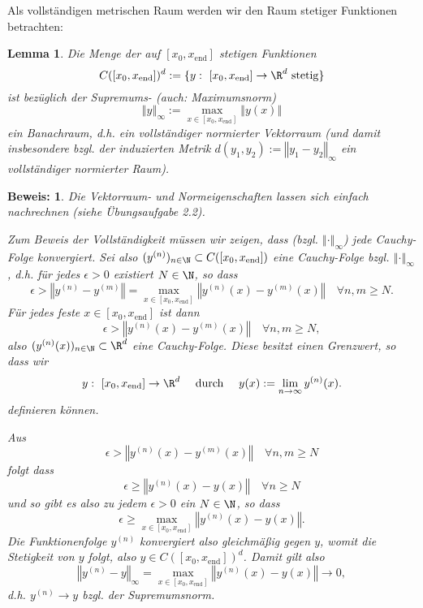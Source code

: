 \documentclass[
]{mycourse}
\theoremstyle{mythm}
\newtheorem{lemma}[theorem]{Lemma}
\theoremstyle{break}
\newtheorem*{beweis}{Beweis:}
\newcommand{\norm}[1]{\left\Vert#1\right\Vert}		%
\begin{document}
Als vollständigen metrischen Raum werden wir den Raum stetiger Funktionen betrachten:
\begin{lemma}
Die Menge der auf $[x_0,x_\mathrm{end}]$ stetigen Funktionen
\[
C([x_0,x_\mathrm{end}])^d:=\{ y: \ [x_0,x_\mathrm{end}]\to \R^d \ \mathrm{stetig} \} 
\]
ist bezüglich der \emph{Supremums-} (auch: \emph{Maximumsnorm})
\[
\norm{y}_\infty:= \max_{x\in [x_0,x_\mathrm{end}]} \norm{y(x)}
\]
ein \emph{Banachraum}, d.h. ein vollständiger normierter Vektorraum
(und damit insbesondere bzgl. der induzierten Metrik $d(y_1,y_2):=\norm{y_1-y_2}_\infty$ ein 
vollständiger normierter Raum).
\end{lemma}
\begin{beweis}
Die Vektorraum- und Normeigenschaften lassen sich einfach nachrechnen (siehe Übungsaufgabe 2.2).

Zum Beweis der Vollständigkeit müssen wir zeigen, dass (bzgl. $\norm{\cdot}_\infty$) jede Cauchy-Folge
konvergiert. Sei also $(y^ {(n)})_{n\in \N}\subset C([x_0,x_\mathrm{end}])$ eine Cauchy-Folge bzgl. $\norm{\cdot}_\infty$, d.h. für jedes $\epsilon>0$ existiert $N\in \N$, so dass
\[
\epsilon>  \norm{y^{(n)}-y^{(m)}}=  \max_{x\in [x_0,x_\mathrm{end}]}  \norm{y^{(n)}(x)-y^{(m)}(x)} \quad \forall n,m\geq N.
\]
Für jedes feste $x\in [x_0,x_\mathrm{end}]$ ist dann
\[
\epsilon>  \norm{y^{(n)}(x)-y^{(m)}(x)}  \quad \forall n,m\geq N,
\]
also $(y^{(n)}(x))_{n\in \N}\subset \R^d$ eine Cauchy-Folge. Diese besitzt einen Grenzwert,
so dass wir 
\[
y:\ [x_0,x_\mathrm{end}]\to \R^d \quad \mbox{ durch } \quad y(x):=\lim_{n\to \infty} y^{(n)}(x).
\]
definieren können.

Aus 
\[
\epsilon>  \norm{y^{(n)}(x)-y^{(m)}(x)}  \quad \forall n,m\geq N
\]
folgt dass
\[
\epsilon\geq \norm{y^{(n)}(x)-y(x)} \quad \forall n\geq N
\]
und so gibt es also zu jedem $\epsilon>0$ ein $N\in \N$, so dass
\[
\epsilon\geq \max_{x\in [x_0,x_\mathrm{end}]}  \norm{y^{(n)}(x)-y(x)}.
\]
Die Funktionenfolge $y^{(n)}$ konvergiert also gleichmäßig gegen $y$, womit die Stetigkeit von 
$y$ folgt, also $y\in C([x_0,x_\mathrm{end}])^d$. Damit gilt also
\[
\norm{y^{(n)}-y}_\infty = \max_{x\in [x_0,x_\mathrm{end}]}  \norm{y^{(n)}(x)-y(x)}\to 0,
\]
d.h. $y^{(n)}\to y$ bzgl. der Supremumsnorm.
\end{beweis}
\end{document}
